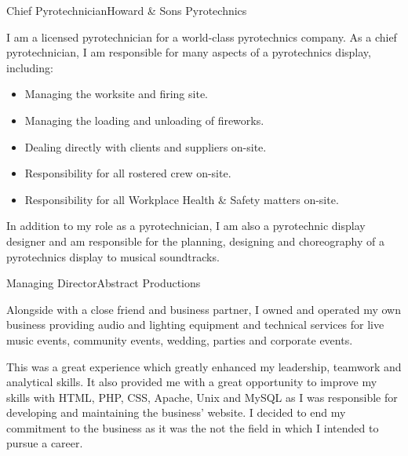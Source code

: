 \begin{professionalExperience}
{Chief Pyrotechnician}{Howard \& Sons Pyrotechnics}
{I am a licensed pyrotechnician for a world-class pyrotechnics company. As a
chief pyrotechnician, I am responsible for many aspects of a pyrotechnics
display, including:
\begin{itemize}
    \item Managing the worksite and firing site.
    \item Managing the loading and unloading of fireworks.
    \item Dealing directly with clients and suppliers on-site.
    \item Responsibility for all rostered crew on-site.
    \item Responsibility for all Workplace Health \& Safety matters on-site.
\end{itemize}

In addition to my role as a pyrotechnician, I am also a pyrotechnic display
designer and am responsible for the planning, designing and choreography of a
pyrotechnics display to musical soundtracks.}
{}

{Managing Director}{Abstract Productions}
{Alongside with a close friend and business partner, I owned and operated my own
business providing audio and lighting equipment and technical services for live
music events, community events, wedding, parties and corporate events.

This was a great experience which greatly enhanced my leadership, teamwork and
analytical skills. It also provided me with a great opportunity to improve my
skills with HTML, PHP, CSS, Apache, Unix and MySQL as I was responsible for
developing and maintaining the business' website. I decided to end my commitment
to the business as it was the not the field in which I intended to pursue a
career.}
{




}

\end{professionalExperience}
